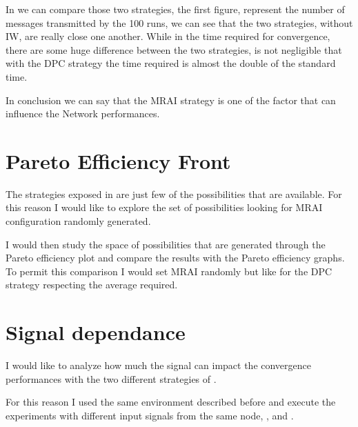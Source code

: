 In  we can compare those two strategies,
the first figure,  represent 
the number of messages transmitted by the \num{100} runs, we can see that
the two strategies, without \ac{IW}, are really close one another.
While in the time required for convergence, 
there are some huge difference between the two strategies, is not negligible 
that with the \ac{DPC} strategy the time required is almost the double of the
standard time.

In conclusion we can say that the \ac{MRAI} strategy is one of the factor that 
can influence the Network performances. 


\section{Pareto Efficiency Front}
\label{sec:bgp_mrai_pareto_front}

The strategies exposed in  are just few
of the possibilities that are available.
For this reason I would like to explore the set of possibilities looking 
for \ac{MRAI} configuration randomly generated.

I would then study the space of possibilities that are generated through the 
Pareto efficiency plot and compare the results with the Pareto efficiency
graphs.
To permit this comparison I would set \ac{MRAI} randomly but like for
the \ac{DPC} strategy respecting the average required.



\section{Signal dependance}
\label{sec:bgp_mrai_signal_dependance}

I would like to analyze how much the signal can impact the convergence performances
with the two different strategies of .

For this reason I used the same environment described before and execute the
experiments with different input signals from the same node, , 
and .

